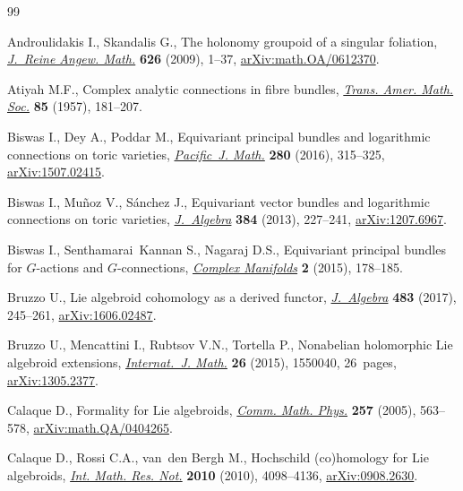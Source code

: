 \documentclass[pdftex]{sigma}
\numberwithin{equation}{section}
\theoremstyle{definition}
\begin{document}
\begin{thebibliography}{99}
\footnotesize\itemsep=0pt

Androulidakis I., Skandalis G., The holonomy groupoid of a singular foliation,
 \href{https://doi.org/10.1515/CRELLE.2009.001}{\textit{J.~Reine Angew.
 Math.}} \textbf{626} (2009), 1--37,
 \href{http://arxiv.org/abs/math.OA/0612370}{arXiv:math.OA/0612370}.

Atiyah M.F., Complex analytic connections in fibre bundles,
 \href{https://doi.org/10.2307/1992969}{\textit{Trans. Amer. Math. Soc.}}
 \textbf{85} (1957), 181--207.

Biswas I., Dey A., Poddar M., Equivariant principal bundles and logarithmic
 connections on toric varieties,
 \href{https://doi.org/10.2140/pjm.2016.280.315}{\textit{Pacific~J. Math.}}
 \textbf{280} (2016), 315--325,
 \href{http://arxiv.org/abs/1507.02415}{arXiv:1507.02415}.

Biswas I., Mu\~noz V., S\'anchez J., Equivariant vector bundles and logarithmic
 connections on toric varieties,
 \href{https://doi.org/10.1016/j.jalgebra.2013.02.039}{\textit{J.~Algebra}}
 \textbf{384} (2013), 227--241,
 \href{http://arxiv.org/abs/1207.6967}{arXiv:1207.6967}.

Biswas I., Senthamarai~Kannan S., Nagaraj D.S., Equivariant principal bundles
 for {$G$}-actions and {$G$}-connections,
 \href{https://doi.org/10.1515/coma-2015-0013}{\textit{Complex Manifolds}}
 \textbf{2} (2015), 178--185.

Bruzzo U., Lie algebroid cohomology as a derived functor,
 \href{https://doi.org/10.1016/j.jalgebra.2017.03.030}{\textit{J.~Algebra}}
 \textbf{483} (2017), 245--261,
 \href{http://arxiv.org/abs/1606.02487}{arXiv:1606.02487}.

Bruzzo U., Mencattini I., Rubtsov V.N., Tortella P., Nonabelian holomorphic
 {L}ie algebroid extensions,
 \href{https://doi.org/10.1142/S0129167X15500408}{\textit{Internat.~J. Math.}}
 \textbf{26} (2015), 1550040, 26~pages,
 \href{http://arxiv.org/abs/1305.2377}{arXiv:1305.2377}.

Calaque D., Formality for {L}ie algebroids,
 \href{https://doi.org/10.1007/s00220-005-1350-5}{\textit{Comm. Math. Phys.}}
 \textbf{257} (2005), 563--578,
 \href{http://arxiv.org/abs/math.QA/0404265}{arXiv:math.QA/0404265}.

Calaque D., Rossi C.A., van~den Bergh M., Hochschild (co)homology for {L}ie
 algebroids, \href{https://doi.org/10.1093/imrn/rnq033}{\textit{Int. Math.
 Res. Not.}} \textbf{2010} (2010), 4098--4136,
 \href{http://arxiv.org/abs/0908.2630}{arXiv:0908.2630}.


\end{thebibliography}
\end{document}

